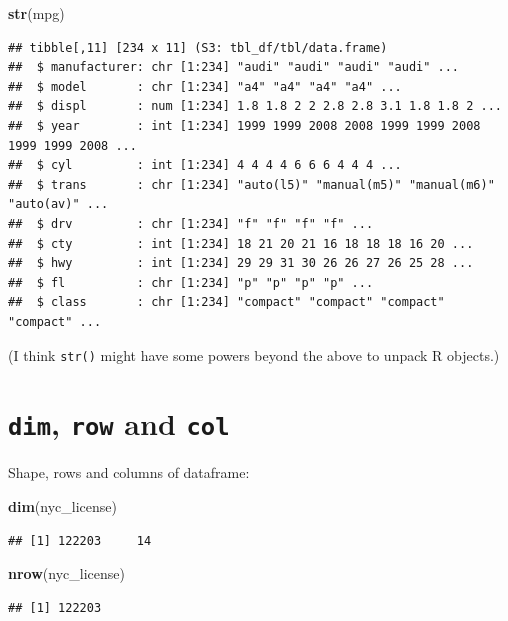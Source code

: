 \documentclass[
]{book}
\newenvironment{Shaded}{\begin{snugshade}}{\end{snugshade}}
\newcommand{\KeywordTok}[1]{\textcolor[rgb]{0.13,0.29,0.53}{\textbf{#1}}}
\newcommand{\NormalTok}[1]{#1}
\begin{document}
\begin{Shaded}
\begin{Highlighting}[]
\KeywordTok{str}\NormalTok{(mpg)}
\end{Highlighting}
\end{Shaded}

\begin{verbatim}
## tibble[,11] [234 x 11] (S3: tbl_df/tbl/data.frame)
##  $ manufacturer: chr [1:234] "audi" "audi" "audi" "audi" ...
##  $ model       : chr [1:234] "a4" "a4" "a4" "a4" ...
##  $ displ       : num [1:234] 1.8 1.8 2 2 2.8 2.8 3.1 1.8 1.8 2 ...
##  $ year        : int [1:234] 1999 1999 2008 2008 1999 1999 2008 1999 1999 2008 ...
##  $ cyl         : int [1:234] 4 4 4 4 6 6 6 4 4 4 ...
##  $ trans       : chr [1:234] "auto(l5)" "manual(m5)" "manual(m6)" "auto(av)" ...
##  $ drv         : chr [1:234] "f" "f" "f" "f" ...
##  $ cty         : int [1:234] 18 21 20 21 16 18 18 18 16 20 ...
##  $ hwy         : int [1:234] 29 29 31 30 26 26 27 26 25 28 ...
##  $ fl          : chr [1:234] "p" "p" "p" "p" ...
##  $ class       : chr [1:234] "compact" "compact" "compact" "compact" ...
\end{verbatim}

(I think \texttt{str()} might have some powers beyond the above to unpack R objects.)

\hypertarget{dim-row-and-col}{%
\section{\texorpdfstring{\texttt{dim}, \texttt{row} and \texttt{col}}{dim, row and col}}\label{dim-row-and-col}}

Shape, rows and columns of dataframe:

\begin{Shaded}
\begin{Highlighting}[]
\KeywordTok{dim}\NormalTok{(nyc_license)}
\end{Highlighting}
\end{Shaded}

\begin{verbatim}
## [1] 122203     14
\end{verbatim}

\begin{Shaded}
\begin{Highlighting}[]
\KeywordTok{nrow}\NormalTok{(nyc_license)}
\end{Highlighting}
\end{Shaded}

\begin{verbatim}
## [1] 122203
\end{verbatim}
\end{document}
